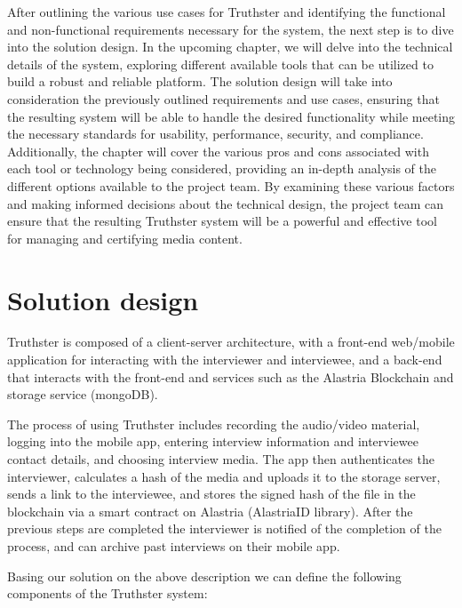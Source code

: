 \documentclass[target=mst,aauheader=]{thud}
\begin{document}
After outlining the various use cases for Truthster and identifying the functional and non-functional requirements necessary for the system, the next step is to dive into the solution design. In the upcoming chapter, we will delve into the technical details of the system, exploring different available tools that can be utilized to build a robust and reliable platform. The solution design will take into consideration the previously outlined requirements and use cases, ensuring that the resulting system will be able to handle the desired functionality while meeting the necessary standards for usability, performance, security, and compliance. Additionally, the chapter will cover the various pros and cons associated with each tool or technology being considered, providing an in-depth analysis of the different options available to the project team. By examining these various factors and making informed decisions about the technical design, the project team can ensure that the resulting Truthster system will be a powerful and effective tool for managing and certifying media content.

\chapter{Solution design}

Truthster is composed of a client-server architecture, with a front-end web/mobile application for interacting with the interviewer and interviewee, and a back-end that interacts with the front-end and services such as the Alastria Blockchain and storage service (mongoDB).\par
The process of using Truthster includes recording the audio/video material, logging into the mobile app, entering interview information and interviewee contact details, and choosing interview media. The app then authenticates the interviewer, calculates a hash of the media and uploads it to the storage server, sends a link to the interviewee, and stores the signed hash of the file in the blockchain via a smart contract on Alastria (AlastriaID library). After the previous steps are completed the interviewer is notified of the completion of the process, and can archive past interviews on their mobile app.\par
Basing our solution on the above description we can define the following components of the Truthster system:
\end{document}
